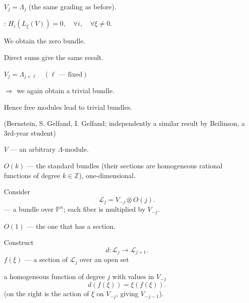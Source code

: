 \(V_j=\Lambda_j\) (the same grading as before).

:
\(H_i(L_\xi(V))=0,\quad\forall i,\quad\forall\xi\ne0\).

We obtain the zero bundle.

Direct sums give the same result.

\(V_j=\Lambda_{j+\ell}\quad(\ell\text{ --- fixed})\)

\(\Rightarrow\) we again obtain a trivial bundle.

Hence free modules lead to trivial bundles.


(Bernstein, S. Gelfand, I. Gelfand;
independently a similar result by Beilinson, a 3rd-year student)


\(V\) --- an arbitrary \(\Lambda\)-module.

\(O(k)\) --- the standard bundles
(their sections are homogeneous rational functions of degree \(k\in\mathbb Z\)), one-dimensional.

Consider
\begin{equation*}
\mathcal L_j=V_{-j}\otimes O(j).
\tag{8}
\end{equation*}
--- a bundle over \(\mathbb P^n\);
each fiber is multiplied by \(V_{-j}\).

\(O(1)\) --- the one that has a section.

Construct
\begin{equation*}
d:\mathcal L_j\longrightarrow\mathcal L_{j+1}.
\tag{9}
\end{equation*}
\(f(\xi)\) --- a section of \(\mathcal L_j\) over an open set

a homogeneous function of degree \(j\) with values in \(V_{-j}\)
\begin{equation*}
d(f(\xi))=\xi(f(\xi)).
\tag{10}
\end{equation*}
(on the right is the action of \(\xi\) on \(V_{-j}\), giving \(V_{-j-1}\)).


